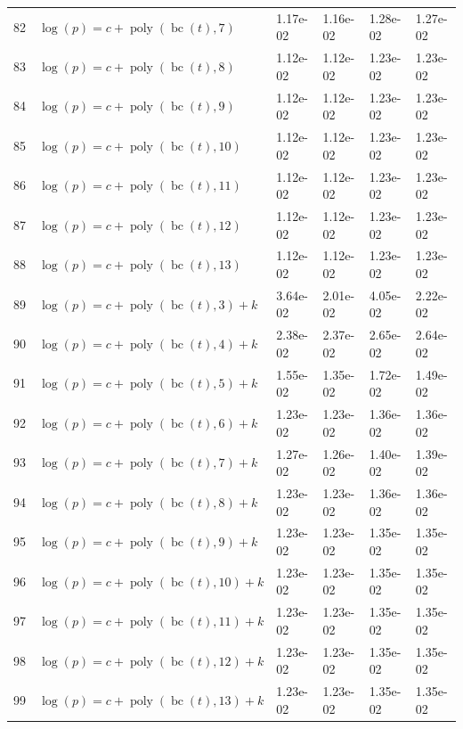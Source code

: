 \documentclass[12pt,a4paper]{article}
\DeclareMathOperator{\bc}{bc}
\DeclareMathOperator{\poly}{poly}
\begin{document}
\begin{longtable}[t]{ll>{\raggedleft\arraybackslash}p{2cm}>{\raggedleft\arraybackslash}p{2cm}>{\raggedleft\arraybackslash}p{2cm}>{\raggedleft\arraybackslash}p{2cm}}
82 & $\log(p) = c + \poly\left( \bc(t), 7 \right)$ & 1.17e-02 & 1.16e-02 & 1.28e-02 & 1.27e-02\\
\rowcolor{gray!6}  83 & $\log(p) = c + \poly\left( \bc(t), 8 \right)$ & 1.12e-02 & 1.12e-02 & 1.23e-02 & 1.23e-02\\
84 & $\log(p) = c + \poly\left( \bc(t), 9 \right)$ & 1.12e-02 & 1.12e-02 & 1.23e-02 & 1.23e-02\\
\rowcolor{gray!6}  85 & $\log(p) = c + \poly\left( \bc(t), 10 \right)$ & 1.12e-02 & 1.12e-02 & 1.23e-02 & 1.23e-02\\
86 & $\log(p) = c + \poly\left( \bc(t), 11 \right)$ & 1.12e-02 & 1.12e-02 & 1.23e-02 & 1.23e-02\\
\rowcolor{gray!6}  87 & $\log(p) = c + \poly\left( \bc(t), 12 \right)$ & 1.12e-02 & 1.12e-02 & 1.23e-02 & 1.23e-02\\
88 & $\log(p) = c + \poly\left( \bc(t), 13 \right)$ & 1.12e-02 & 1.12e-02 & 1.23e-02 & 1.23e-02\\
\rowcolor{gray!6}  89 & $\log(p) = c + \poly\left( \bc(t), 3 \right) + k$ & 3.64e-02 & 2.01e-02 & 4.05e-02 & 2.22e-02\\
90 & $\log(p) = c + \poly\left( \bc(t), 4 \right) + k$ & 2.38e-02 & 2.37e-02 & 2.65e-02 & 2.64e-02\\
\rowcolor{gray!6}  91 & $\log(p) = c + \poly\left( \bc(t), 5 \right) + k$ & 1.55e-02 & 1.35e-02 & 1.72e-02 & 1.49e-02\\
92 & $\log(p) = c + \poly\left( \bc(t), 6 \right) + k$ & 1.23e-02 & 1.23e-02 & 1.36e-02 & 1.36e-02\\
\rowcolor{gray!6}  93 & $\log(p) = c + \poly\left( \bc(t), 7 \right) + k$ & 1.27e-02 & 1.26e-02 & 1.40e-02 & 1.39e-02\\
94 & $\log(p) = c + \poly\left( \bc(t), 8 \right) + k$ & 1.23e-02 & 1.23e-02 & 1.36e-02 & 1.36e-02\\
\rowcolor{gray!6}  95 & $\log(p) = c + \poly\left( \bc(t), 9 \right) + k$ & 1.23e-02 & 1.23e-02 & 1.35e-02 & 1.35e-02\\
96 & $\log(p) = c + \poly\left( \bc(t), 10 \right) + k$ & 1.23e-02 & 1.23e-02 & 1.35e-02 & 1.35e-02\\
\rowcolor{gray!6}  97 & $\log(p) = c + \poly\left( \bc(t), 11 \right) + k$ & 1.23e-02 & 1.23e-02 & 1.35e-02 & 1.35e-02\\
98 & $\log(p) = c + \poly\left( \bc(t), 12 \right) + k$ & 1.23e-02 & 1.23e-02 & 1.35e-02 & 1.35e-02\\
\rowcolor{gray!6}  99 & $\log(p) = c + \poly\left( \bc(t), 13 \right) + k$ & 1.23e-02 & 1.23e-02 & 1.35e-02 & 1.35e-02\\

\end{longtable}
\end{document}
